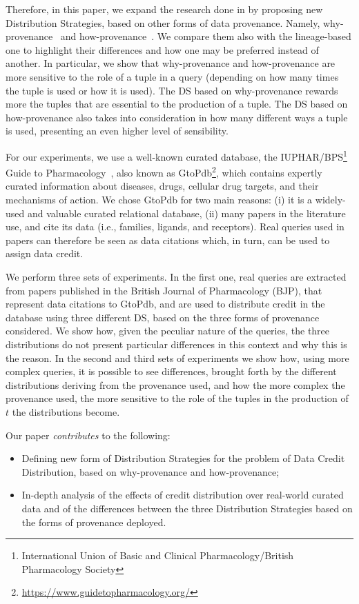 Therefore, in this paper, we expand the research done in \citep{dosso2020data} by proposing new Distribution Strategies, based on other forms of data provenance. 
Namely, why-provenance~\citep{WhyProvBuneman} and how-provenance~\cite{howProvenanceGreen}. 
We compare them also with the lineage-based one to highlight their differences and how one may be preferred instead of another. 
In particular, we show that why-provenance and how-provenance are more sensitive to the role of a tuple in a query (depending on how many times the tuple is used or how it is used). 
The DS based on why-provenance rewards more the tuples that are essential to the production of a tuple.
The DS based on how-provenance also takes into consideration in how many different ways a tuple is used, presenting an even higher level of sensibility. 

For our experiments, we use a well-known curated database, the IUPHAR/BPS\footnote{International Union of Basic and Clinical Pharmacology/British Pharmacology Society} Guide to Pharmacology~\citep{iuphar2018}, also known as GtoPdb\footnote{\url{https://www.guidetopharmacology.org/}}, which contains expertly curated information about diseases, drugs, cellular drug targets, and their mechanisms of action.
We chose GtoPdb for two main reasons: (i) it is a widely-used and valuable curated relational database, (ii) many papers in the literature use, and cite its data (i.e., families, ligands, and receptors). 
Real queries used in papers can therefore be seen as data citations which, in turn, can be used to assign data credit.

We perform three sets of experiments. In the first one, real queries are extracted from papers published in the British Journal of Pharmacology (BJP), that represent data citations to GtoPdb, and are used to distribute credit in the database using three different DS, based on the three forms of provenance considered. 
We show how, given the peculiar nature of the queries, the three distributions do not present particular differences in this context and why this is the reason. 
In the second and third sets of experiments we show how, using more complex queries, it is possible to see differences, brought forth by the different distributions deriving from the provenance used, and how the more complex the provenance used, the more sensitive to the role of the tuples in the production of $t$ the distributions become.


Our paper \emph{contributes} to the following:
\begin{itemize}
    \item Defining new form of Distribution Strategies for the problem of Data Credit Distribution, based on why-provenance and how-provenance;
    \item In-depth analysis of the effects of credit distribution over real-world curated data and of the differences between the three Distribution Strategies based on the forms of provenance deployed.
\end{itemize}

